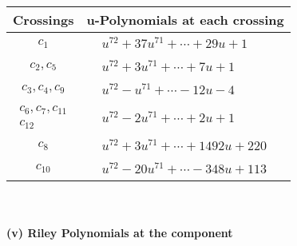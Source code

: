 \documentclass[1p]{elsarticle_modified}
\theoremstyle{definition}
\begin{document}
\begin{tabular}{m{50pt}|m{274pt}}
Crossings & \hspace{64pt}u-Polynomials at each crossing \\
\hline $$\begin{aligned}c_{1}\end{aligned}$$&$\begin{aligned}
&u^{72}+37 u^{71}+\cdots+29 u+1
\end{aligned}$\\
\hline $$\begin{aligned}c_{2},c_{5}\end{aligned}$$&$\begin{aligned}
&u^{72}+3 u^{71}+\cdots+7 u+1
\end{aligned}$\\
\hline $$\begin{aligned}c_{3},c_{4},c_{9}\end{aligned}$$&$\begin{aligned}
&u^{72}- u^{71}+\cdots-12 u-4
\end{aligned}$\\
\hline $$\begin{aligned}c_{6},c_{7},c_{11}\\c_{12}\end{aligned}$$&$\begin{aligned}
&u^{72}-2 u^{71}+\cdots+2 u+1
\end{aligned}$\\
\hline $$\begin{aligned}c_{8}\end{aligned}$$&$\begin{aligned}
&u^{72}+3 u^{71}+\cdots+1492 u+220
\end{aligned}$\\
\hline $$\begin{aligned}c_{10}\end{aligned}$$&$\begin{aligned}
&u^{72}-20 u^{71}+\cdots-348 u+113
\end{aligned}$\\
\hline
\end{tabular}\\~\\
\newpage\renewcommand{\arraystretch}{1}
\flushleft \textbf{(v) Riley Polynomials at the component}\newline \\
\end{document}
